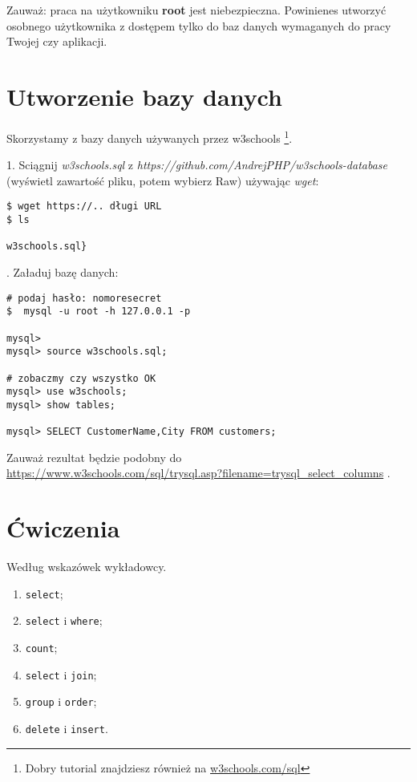 \documentclass[12pt, letterpaper]{article}
\begin{document}
Zauważ: praca na użytkowniku \textbf{root} jest niebezpieczna. Powinienes utworzyć osobnego użytkownika z dostępem tylko do baz danych wymaganych do pracy Twojej czy aplikacji.

\section{Utworzenie bazy danych}

Skorzystamy z bazy danych używanych przez w3schools \footnote{Dobry tutorial znajdziesz również na \href{https://www.w3schools.com/sql/default.asp}{w3schools.com/sql}}.

\bigskip

1. Sciągnij \emph{w3schools.sql} z \emph{https://github.com/AndrejPHP/w3schools-database} (wyświetl zawartość pliku, potem wybierz Raw) używając \emph{wget}:

\begin{verbatim}
$ wget https://.. długi URL
$ ls

w3schools.sql}
\end{verbatim}

. Załaduj bazę danych:

\begin{verbatim}
# podaj hasło: nomoresecret
$  mysql -u root -h 127.0.0.1 -p

mysql> 
mysql> source w3schools.sql;

# zobaczmy czy wszystko OK
mysql> use w3schools;
mysql> show tables;

mysql> SELECT CustomerName,City FROM customers;
\end{verbatim}

Zauważ rezultat będzie podobny do\\ 
\href{https://www.w3schools.com/sql/trysql.asp?filename=trysql_select_columns}{https://www.w3schools.com/sql/trysql.asp?filename=trysql\_select\_columns} .


\section{Ćwiczenia}
Według wskazówek wykładowcy.

\begin{enumerate}
 \item \verb|select|;
 \item \verb|select| i \verb|where|;
 \item \verb|count|;
 \item \verb|select| i \verb|join|;
 \item \verb|group| i \verb|order|;
 \item \verb|delete| i \verb|insert|.
\end{enumerate}
\end{document}
